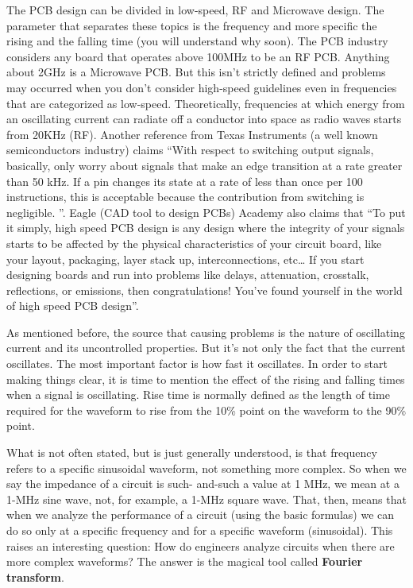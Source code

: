 \documentclass[final]{cubedoc}
\begin{document}
	The PCB design can be divided in low-speed, RF and Microwave design. The parameter that separates these topics is the frequency and more specific the rising and the falling time (you will understand why soon). The PCB industry considers any board that operates above 100MHz to be an RF PCB. Anything about 2GHz is a Microwave PCB. But this isn’t strictly defined and problems may occurred when you don’t consider high-speed guidelines even in frequencies that are categorized as low-speed. Theoretically, frequencies at which energy from an oscillating current can radiate off a conductor into space as radio waves starts from 20KHz (RF). Another reference from Texas Instruments (a well known semiconductors industry) claims “With respect to switching output signals, basically, only worry about signals that make an edge transition at a rate greater than 50 kHz. If a pin changes its state at a rate of less than once per 100 instructions, this is acceptable because the contribution from switching is negligible. ”.  Eagle (CAD tool to design PCBs) Academy also claims that “To put it simply, high speed PCB design is any design where the integrity of your signals starts to be affected by the physical characteristics of your circuit board, like your layout, packaging, layer stack up, interconnections, etc… If you start designing boards and run into problems like delays, attenuation, crosstalk, reflections, or emissions, then congratulations! You’ve found yourself in the world of high speed PCB design”.
	
	As mentioned before, the source that causing problems is the nature of oscillating current and its uncontrolled properties. But it’s not only the fact that the current oscillates. The most important factor is how fast it oscillates. In order to start making things clear, it is time to mention the effect of the rising and falling times when a signal is oscillating. Rise time is normally defined as the length of time required for the waveform to rise from the 10\% point on the waveform to the 90\% point.
	
	What is not often stated, but is just generally understood, is that frequency refers to a specific sinusoidal waveform, not something more complex. So when we say the impedance of a circuit is such- and-such a value at 1 MHz, we mean at a 1-MHz sine wave, not, for example, a 1-MHz square wave. That, then, means that when we analyze the performance of a circuit (using the basic formulas) we can do so only at a specific frequency and for a specific waveform (sinusoidal). This raises an interesting question: How do engineers analyze circuits when there are more complex waveforms? The answer is the magical tool called \textbf{Fourier transform}. 
	
\end{document}
